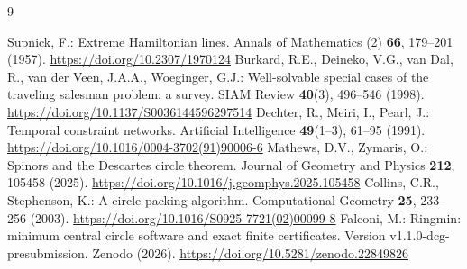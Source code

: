 \documentclass[11pt]{article}
\theoremstyle{definition}
\theoremstyle{remark}
\begin{document}
\begin{thebibliography}{9}
\small\raggedright
{}
Supnick, F.: Extreme Hamiltonian lines. Annals of Mathematics (2)
\textbf{66}, 179--201 (1957). \url{https://doi.org/10.2307/1970124}
Burkard, R.E., Deineko, V.G., van Dal, R., van der Veen, J.A.A., Woeginger,
G.J.: Well-solvable special cases of the traveling salesman problem:
a survey. SIAM Review \textbf{40}(3), 496--546 (1998).
\url{https://doi.org/10.1137/S0036144596297514}
Dechter, R., Meiri, I., Pearl, J.: Temporal constraint networks.
Artificial Intelligence \textbf{49}(1--3), 61--95 (1991).
\url{https://doi.org/10.1016/0004-3702(91)90006-6}
Mathews, D.V., Zymaris, O.: Spinors and the Descartes circle theorem.
Journal of Geometry and Physics \textbf{212}, 105458 (2025).
\url{https://doi.org/10.1016/j.geomphys.2025.105458}
Collins, C.R., Stephenson, K.: A circle packing algorithm.
Computational Geometry \textbf{25}, 233--256 (2003).
\url{https://doi.org/10.1016/S0925-7721(02)00099-8}
Falconi, M.: Ringmin: minimum central circle software and exact finite
certificates. Version v1.1.0-dcg-presubmission. Zenodo (2026).
\url{https://doi.org/10.5281/zenodo.22849826}
\end{thebibliography}
\end{document}
